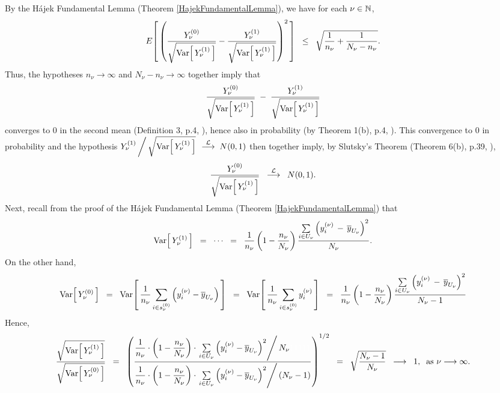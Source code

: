 \proof
By the H\'ajek Fundamental Lemma (Theorem \ref{HajekFundamentalLemma}),
we have for each $\nu \in \mathbb{N}$,
\begin{equation*}
E\!\left[\,\left(
  \dfrac{Y^{(0)}_{\nu}}{\sqrt{\textnormal{Var}\!\left[\,Y^{(1)}_{\nu}\,\right]}}
- \dfrac{Y^{(1)}_{\nu}}{\sqrt{\textnormal{Var}\!\left[\,Y^{(1)}_{\nu}\,\right]}}
\right)^{2}\,\right]
\;\; \leq \;\;
\sqrt{\dfrac{1}{n_{\nu}} + \dfrac{1}{N_{\nu}-n_{\nu}}}.
\end{equation*}
Thus, the hypotheses $n_{\nu} \longrightarrow \infty$ and $N_{\nu} - n_{\nu} \longrightarrow \infty$
together imply that
\begin{equation*}
\dfrac{Y^{(0)}_{\nu}}{\sqrt{\textnormal{Var}\!\left[\,Y^{(1)}_{\nu}\,\right]}}
\; - \;
\dfrac{Y^{(1)}_{\nu}}{\sqrt{\textnormal{Var}\!\left[\,Y^{(1)}_{\nu}\,\right]}}
\end{equation*}
converges to $0$ in the second mean (Definition 3, p.4, \cite{Ferguson1996}),
hence also in probability (by Theorem 1(b), p.4, \cite{Ferguson1996}).
This convergence to $0$ in probability and the hypothesis\;
$Y^{(1)}_{\nu}\left/\,\sqrt{\textnormal{Var}\!\left[\,Y^{(1)}_{\nu}\,\right]}\right.\;\overset{\mathcal{L}}{\longrightarrow}\;N(0,1)$
then together imply, by Slutsky's Theorem (Theorem 6(b), p.39, \cite{Ferguson1996}),
\begin{equation*}
\dfrac{Y^{(0)}_{\nu}}{\sqrt{\textnormal{Var}\!\left[\,Y^{(1)}_{\nu}\,\right]}}
\;\;\overset{\mathcal{L}}{\longrightarrow}\;\;
N(0,1).
\end{equation*}
Next, recall from the proof of the H\'ajek Fundamental Lemma (Theorem \ref{HajekFundamentalLemma}) that
\begin{equation*}
\textnormal{Var}\!\left[\,Y^{(1)}_{\nu}\,\right]
\;\; = \;\; \cdots \;\; = \;\;
\dfrac{1}{n_{\nu}}
\left(1 - \dfrac{n_{\nu}}{N_{\nu}}\right)
\dfrac{\underset{i\in U_{\nu}}{\sum}\left(y^{(\nu)}_{i}\,-\,\overline{y}_{U_{\nu}}\right)^{2}}{N_{\nu}}.
\end{equation*}
On the other hand,
\begin{equation*}
\textnormal{Var}\!\left[\,Y^{(0)}_{\nu}\,\right]
\;\; = \;\;
\textnormal{Var}\!\left[\,
\dfrac{1}{n_{\nu}}\,\underset{i \in s^{(0)}_{\nu}}{\sum} \left(y^{(\nu)}_{i} - \overline{y}_{U_{\nu}}\right)
\,\right]
\;\; = \;\;
\textnormal{Var}\!\left[\,
\dfrac{1}{n_{\nu}}\,\underset{i \in s^{(0)}_{\nu}}{\sum}\,y^{(\nu)}_{i}
\,\right]
\;\; = \;\;
\dfrac{1}{n_{\nu}}
\left(1 - \dfrac{n_{\nu}}{N_{\nu}}\right)
\dfrac{\underset{i\in U_{\nu}}{\sum}\left(y^{(\nu)}_{i}\,-\,\overline{y}_{U_{\nu}}\right)^{2}}{N_{\nu}-1}
\end{equation*}
Hence,
\begin{equation*}
\dfrac{
\sqrt{\Var\!\left[\,Y^{(1)}_{\nu}\,\right]}
}{
\sqrt{\Var\!\left[\,Y^{(0)}_{\nu}\,\right]}
}
\;\;=\;\;
\left(
\dfrac{
\dfrac{1}{n_{\nu}}
\cdot
\left(1 - \dfrac{n_{\nu}}{N_{\nu}}\right)
\cdot
\left.\underset{i\in U_{\nu}}{\sum}\left(y^{(\nu)}_{i}-\overline{y}_{U_{\nu}}\right)^{2}\right/ N_{\nu}\mbox{\color{white}11111}
}{
\dfrac{1}{n_{\nu}}
\cdot
\left(1 - \dfrac{n_{\nu}}{N_{\nu}}\right)
\cdot
\left.\underset{i\in U_{\nu}}{\sum}\left(y^{(\nu)}_{i}-\overline{y}_{U_{\nu}}\right)^{2}\right/ \left(N_{\nu}-1\right)
}
\right)^{1/2}
\;\;=\;\;
\sqrt{\dfrac{N_{\nu}-1}{N_{\nu}}}
\;\; \longrightarrow \;\; 1,
\;\;\textnormal{as $\nu \longrightarrow \infty$.}
\end{equation*}
